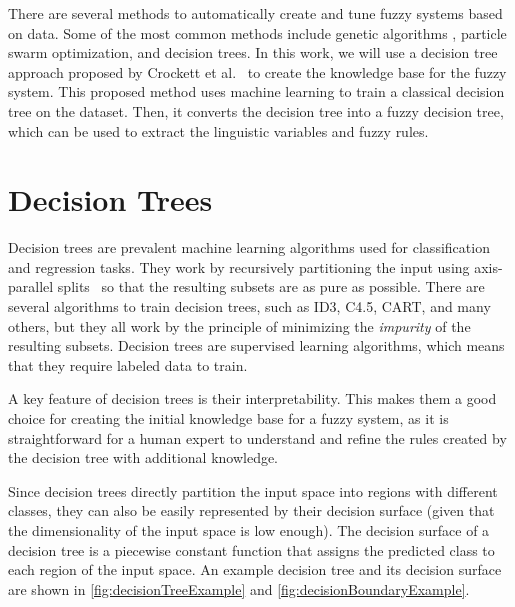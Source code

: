 There are several methods to automatically create and tune fuzzy systems based on data. Some of the most common methods include genetic algorithms , particle swarm optimization, and decision trees.
In this work, we will use a decision tree approach proposed by Crockett et al.~\cite{CROCKETT20062809} to create the knowledge base for the fuzzy system. This proposed method uses machine learning to train a classical decision tree on the dataset. Then, it converts the decision tree into a fuzzy decision tree, which can be used to extract the linguistic variables and fuzzy rules.


\section{Decision Trees}

Decision trees are prevalent machine learning algorithms used for classification and regression tasks. They work by recursively partitioning the input using axis-parallel splits~\cite{10.5555/2380985} so that the resulting subsets are as pure as possible. There are several algorithms to train decision trees, such as ID3, C4.5, CART, and many others, but they all work by the principle of minimizing the \textit{impurity} of the resulting subsets. Decision trees are supervised learning algorithms, which means that they require labeled data to train.

A key feature of decision trees is their interpretability. This makes them a good choice for creating the initial knowledge base for a fuzzy system, as it is straightforward for a human expert to understand and refine the rules created by the decision tree with additional knowledge.

Since decision trees directly partition the input space into regions with different classes, they can also be easily represented by their decision surface (given that the dimensionality of the input space is low enough). The decision surface of a decision tree is a piecewise constant function that assigns the predicted class to each region of the input space. An example decision tree and its decision surface are shown in \autoref{fig:decisionTreeExample} and \autoref{fig:decisionBoundaryExample}.

